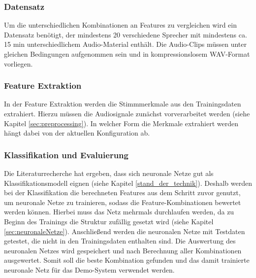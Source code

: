 


\subsubsection{Datensatz} \label{sec:KonzeptDatensatz}

Um die unterschiedlichen Kombinationen an Features zu vergleichen wird ein Datensatz benötigt, der mindestens 20 verschiedene Sprecher mit mindestens ca. 15 min unterschiedlichem Audio-Material enthält.
Die Audio-Clips müssen unter gleichen Bedingungen aufgenommen sein und in kompressionslosem WAV-Format vorliegen.

\subsubsection{Feature Extraktion}

In der Feature Extraktion werden die Stimmmerkmale aus den Trainingsdaten extrahiert.
Hierzu müssen die Audiosignale zunächst vorverarbeitet werden (siehe Kapitel \ref{sec:preprocessing}).
In welcher Form die Merkmale extrahiert werden hängt dabei von der aktuellen Konfiguration ab.

\subsubsection{Klassifikation und Evaluierung}\label{sec:KonzeptKlassifikation}

Die Literaturrecherche hat ergeben, dass sich neuronale Netze gut als Klassifikationsmodell eignen (siehe Kapitel \ref{stand_der_technik}). 
Deshalb werden bei der Klassifikation die berechneten Features aus dem Schritt zuvor genutzt, um neuronale Netze zu trainieren, sodass die Feature-Kombinationen bewertet werden können.
Hierbei muss das Netz mehrmals durchlaufen werden, da zu Beginn des Trainings die Struktur zufällig gesetzt wird (siehe Kapitel \ref{sec:neuronaleNetze}).
Anschließend werden die neuronalen Netze mit Testdaten getestet, die nicht in den Trainingsdaten enthalten sind.
Die Auswertung des neuronalen Netzes wird gespeichert und nach Berechnung aller Kombinationen ausgewertet.
Somit soll die beste Kombination gefunden und das damit trainierte neuronale Netz für das Demo-System verwendet werden.

